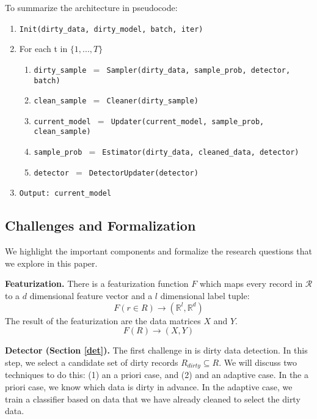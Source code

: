 To summarize the architecture in pseudocode:
\begin{enumerate}\scriptsize\sloppy
\item \texttt{Init(dirty\_data, dirty\_model, batch, iter)}
\item For each t in $\{1,...,T\}$
\begin{enumerate}
	\item \texttt{dirty\_sample $=$ Sampler(dirty\_data, sample\_prob, detector, batch)}
	\item \texttt{clean\_sample $=$ Cleaner(dirty\_sample)}
	\item \texttt{current\_model $=$ Updater(current\_model, sample\_prob, clean\_sample)}
	\item \texttt{sample\_prob $=$ Estimator(dirty\_data, cleaned\_data, detector)}
	\item \texttt{detector $=$ DetectorUpdater(detector)}
\end{enumerate}
\item \texttt{Output: current\_model}
\end{enumerate}

\subsection{Challenges and Formalization}
We highlight the important components and formalize the research questions that we explore in this paper. 

\vspace{0.5em}

\noindent \textbf{Featurization. } 
There is a featurization function $F$ which maps every record in $\mathcal{R}$ to a $d$ dimensional feature vector and a $l$ dimensional label tuple: 
\[F(r \in R) \rightarrow (\mathbb{R}^l, \mathbb{R}^d)\]
The result of the featurization are the data matrices $X$ and $Y$.
\[
F(R)\rightarrow (X,Y)
\]

\vspace{0.5em}

\noindent\textbf{Detector (Section \ref{det}). } The first challenge in \sys is dirty data detection. In this step, we select a candidate set of dirty records $R_{dirty} \subseteq R$. We will discuss two techniques to do this: (1) an a priori case, and (2) and an adaptive case. In the a priori case, we know which data is dirty in advance. In the adaptive case, we train a classifier based on data that we have already cleaned to select the dirty data.

\vspace{0.5em}


